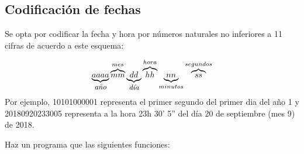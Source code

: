 \separacion
\subsection{Codificación de fechas}

Se opta por codificar la fecha y hora por números naturales no inferiores a 11 cifras de acuerdo a este esquema:

$$
\underbrace{aaaa}_{\mbox{\small \it año}}
\overbrace{mm}^{mes}
\underbrace{dd}_{\mbox{\small \it día}}
\overbrace{hh}^{hora}
\underbrace{nn}_{minutos}
\overbrace{ss}^{segundos}
$$
Por ejemplo,  10101000001 representa el primer segundo del primer dia del año 1 y 20180920233005 representa a la hora 23h 30' 5'' del día 20 de septiembre (mes 9) de 2018.

Haz un programa que las siguientes funciones:

